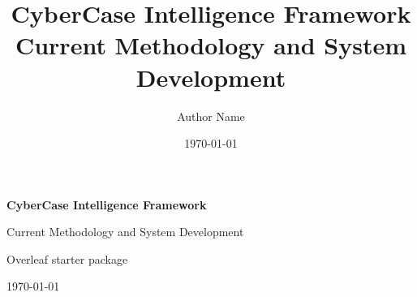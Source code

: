 \documentclass[12pt,a4paper,oneside]{report}
\title{CyberCase Intelligence Framework\\[0.5em]\large Current Methodology and System Development}
\author{Author Name}
\date{\today}
\begin{document}
\begin{titlepage}
    \centering
    \vspace*{2.5cm}
    {\Large\bfseries CyberCase Intelligence Framework\par}
    \vspace{0.8cm}
    {\large Current Methodology and System Development\par}
    \vfill
    {\large Overleaf starter package\par}
    \vspace{0.4cm}
    {\large \today\par}
\end{titlepage}

\tableofcontents
\clearpage
{}



\end{document}
